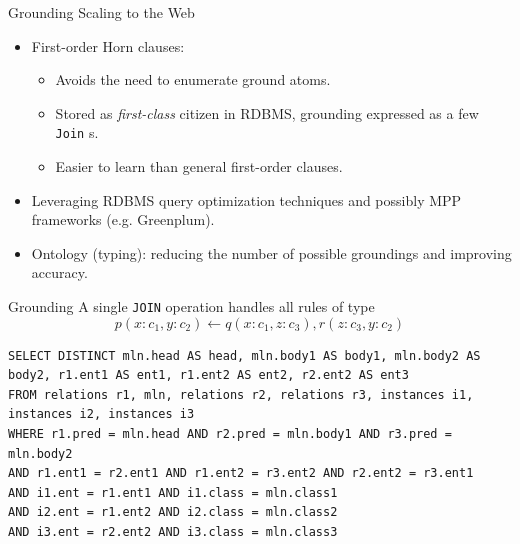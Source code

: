 \documentclass[onlymath,xcolor=pdftex,dvipsnames,table]{beamer}
\let\oldemph\emph
\renewcommand{\emph}[1]{{\color{Blue}\oldemph{#1}}}
\newcommand{\stt}[1]{\texttt{\small #1}\xspace}
\newcommand{\head}[1]{{\large\color{OliveGreen}#1\\[2pt]}}
\begin{document}
\begin{frame}{Grounding}
\head{Scaling to the Web}
\begin{itemize}
  \item First-order Horn clauses:
  \begin{itemize}
    \item Avoids the need to enumerate ground atoms.
    \item Stored as \emph{first-class} citizen in RDBMS, grounding expressed as a few \stt{Join}s.
    \item Easier to learn than general first-order clauses.
  \end{itemize}
  \item Leveraging RDBMS query optimization techniques and possibly MPP frameworks (e.g. Greenplum).
  \item Ontology (typing): reducing the number of possible groundings and improving accuracy.
\end{itemize}
\end{frame}

\begin{frame}[fragile]{Grounding}
A single \stt{JOIN} operation handles all rules of type
$$
p(x: c_1, y: c_2)\leftarrow q(x: c_1, z: c_3), r(z: c_3, y: c_2)
$$
\begin{lstlisting}
SELECT DISTINCT mln.head AS head, mln.body1 AS body1, mln.body2 AS body2, r1.ent1 AS ent1, r1.ent2 AS ent2, r2.ent2 AS ent3
FROM relations r1, mln, relations r2, relations r3, instances i1, instances i2, instances i3
WHERE r1.pred = mln.head AND r2.pred = mln.body1 AND r3.pred = mln.body2
AND r1.ent1 = r2.ent1 AND r1.ent2 = r3.ent2 AND r2.ent2 = r3.ent1
AND i1.ent = r1.ent1 AND i1.class = mln.class1
AND i2.ent = r1.ent2 AND i2.class = mln.class2
AND i3.ent = r2.ent2 AND i3.class = mln.class3
\end{lstlisting}
\end{frame}
\end{document}
